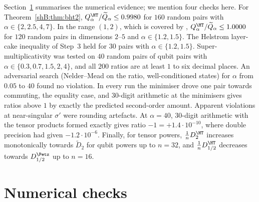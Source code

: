 Section~\ref{shB:sec:numerics} summarises the numerical evidence; we mention four checks here. For Theorem~\ref{shB:thm:bht2}, $Q^\HT_\alpha/\widetilde Q_\alpha\le0.9980$ for $160$ random pairs with $\alpha\in\{2,2.5,4,7\}$. In the range $(1,2)$, which is covered by \cite{LiuHircheCheng2025}, $Q^\HT_\alpha/\widetilde Q_\alpha\le1.0000$ for $120$ random pairs in dimensions $2$--$5$ and $\alpha\in\{1.2,1.5\}$. The Helstrom layer-cake inequality of Step~3 held for $30$ pairs with $\alpha\in\{1.2,1.5\}$. Super-multiplicativity was tested on $40$ random pairs of qubit pairs with $\alpha\in\{0.3,0.7,1.5,2,4\}$, and all $200$ ratios are at least $1$ to six decimal places. An adversarial search (Nelder--Mead on the ratio, well-conditioned states) for $\alpha$ from $0.05$ to $40$ found no violation. In every run the minimiser drove one pair towards commuting, the equality case, and $30$-digit arithmetic at the minimisers gives ratios above $1$ by exactly the predicted second-order amount. Apparent violations at near-singular $\sigma'$ were rounding artefacts. At $\alpha=40$, $30$-digit arithmetic with the tensor products formed exactly gives ratio $-1=+1.4\cdot10^{-10}$, where double precision had given $-1.2\cdot10^{-6}$. Finally, for tensor powers, $\frac1nD^\HT_2$ increases monotonically towards $\widetilde D_2$ for qubit powers up to $n=32$, and $\frac1nD^\HT_{1/2}$ decreases towards $D^\Petz_{1/2}$ up to $n=16$.

\section{Numerical checks}\label{shB:sec:numerics}

